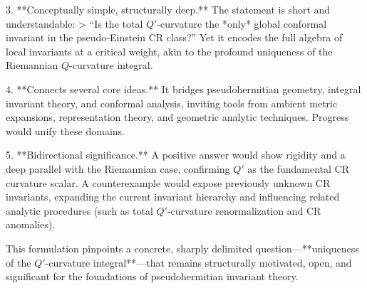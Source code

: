 3. **Conceptually simple, structurally deep.**  
   The statement is short and understandable:  
   > “Is the total \(Q'\)-curvature the *only* global conformal invariant in the pseudo‑Einstein CR class?”  
   Yet it encodes the full algebra of local invariants at a critical weight, akin to the profound uniqueness of the Riemannian \(Q\)-curvature integral.

4. **Connects several core ideas.**  
   It bridges pseudohermitian geometry, integral invariant theory, and conformal analysis, inviting tools from ambient metric expansions, representation theory, and geometric analytic techniques.  Progress would unify these domains.

5. **Bidirectional significance.**  
   A positive answer would show rigidity and a deep parallel with the Riemannian case, confirming \(Q'\) as the fundamental CR curvature scalar.  
   A counterexample would expose previously unknown CR invariants, expanding the current invariant hierarchy and influencing related analytic procedures (such as total \(Q'\)-curvature renormalization and CR anomalies).

This formulation pinpoints a concrete, sharply delimited question—**uniqueness of the \(Q'\)-curvature integral**—that remains structurally motivated, open, and significant for the foundations of pseudohermitian invariant theory.